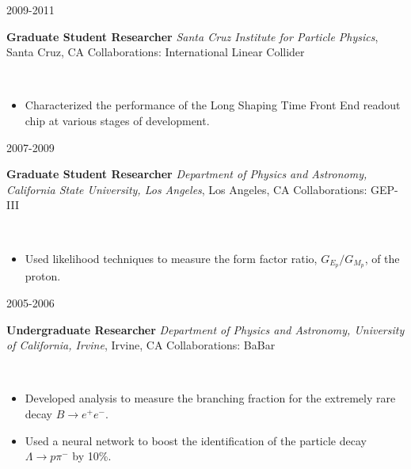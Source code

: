 \documentclass[11pt]{article}
\newcommand{\experienceentrycollab}[6] { 
    \noindent
    \begin{minipage}[t]{0.15\textwidth} \begin{flushright} #1 \end{flushright} \end{minipage} \hspace{0.01\textwidth}
    \begin{minipage}[t]{0.84\textwidth} 
        \textbf{#2} \newline
        \emph{#3}, #4 \newline
        Collaborations: #5
    \end{minipage} \\[0.01pt]
    #6 \vspace{11pt}
}
\begin{document}
        \experienceentrycollab{2009-2011}
                        {Graduate Student Researcher}
                        {Santa Cruz Institute for Particle Physics}
                        {Santa Cruz, CA}
                        {International Linear Collider}
                        {
                            \begin{itemize}[label=\textcolor{indigodye}{$\circ$}, noitemsep, nolistsep, leftmargin=0.19\textwidth]
                                \item Characterized the performance of the Long Shaping Time Front End readout chip at
                                      various stages of development.
                            \end{itemize}
                        } 
        \experienceentrycollab{2007-2009}
                        {Graduate Student Researcher}
                        {Department of Physics and Astronomy, California State University, Los Angeles}
                        {Los Angeles, CA}
                        {GEP-III}
                        {
                            \begin{itemize}[label=\textcolor{indigodye}{$\circ$}, noitemsep, nolistsep, leftmargin=0.19\textwidth]
                                \item Used likelihood techniques to measure the form factor ratio, $G_{E_p}/G_{M_p}$, of
                                      the proton.
                            \end{itemize}
                        }  
        \experienceentrycollab{2005-2006}
                        {Undergraduate Researcher}
                        {Department of Physics and Astronomy, University of California, Irvine}
                        {Irvine, CA}
                        {BaBar}
                        { 
                            \begin{itemize}[label=\textcolor{indigodye}{$\circ$}, noitemsep, nolistsep, leftmargin=0.19\textwidth]
                                \item Developed analysis to measure the branching fraction for the extremely rare decay 
                                      $B\rightarrow e^+e^-$.
                                \item Used a neural network to boost the identification of the particle decay 
                                      $\Lambda \rightarrow p \pi^-$ by 10\%.
                            \end{itemize}
                       } 
\end{document}
